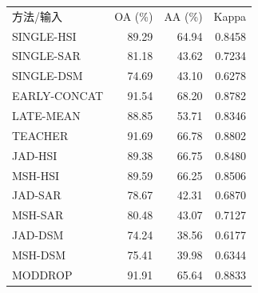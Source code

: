 \begin{tabular}{lrrr}
\toprule
方法/输入 & OA (\%) & AA (\%) & Kappa \\
SINGLE-HSI & 89.29 & 64.94 & 0.8458 \\
SINGLE-SAR & 81.18 & 43.62 & 0.7234 \\
SINGLE-DSM & 74.69 & 43.10 & 0.6278 \\
EARLY-CONCAT & 91.54 & 68.20 & 0.8782 \\
LATE-MEAN & 88.85 & 53.71 & 0.8346 \\
TEACHER & 91.69 & 66.78 & 0.8802 \\
JAD-HSI & 89.38 & 66.75 & 0.8480 \\
MSH-HSI & 89.59 & 66.25 & 0.8506 \\
JAD-SAR & 78.67 & 42.31 & 0.6870 \\
MSH-SAR & 80.48 & 43.07 & 0.7127 \\
JAD-DSM & 74.24 & 38.56 & 0.6177 \\
MSH-DSM & 75.41 & 39.98 & 0.6344 \\
MODDROP & 91.91 & 65.64 & 0.8833 \\
\bottomrule
\end{tabular}
